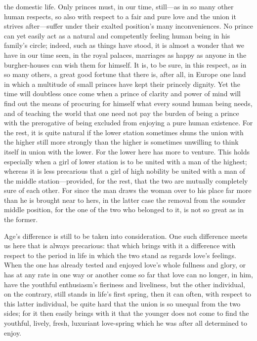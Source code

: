 \documentclass[12pt,a4paper]{book}
\begin{document}
the domestic life. Only princes must, in our time, still---as in so many
other human respects, so also with respect to a fair and pure love and the
union it strives after---suffer under their exalted position's many
inconveniences. No prince can yet easily act as a natural and competently
feeling human being in his family's circle; indeed, such as things have
stood, it is almost a wonder that we have in our time seen, in the royal
palaces, marriages as happy as anyone in the burgher-houses can wish them
for himself. It is, to be sure, in this respect, as in so many others, a
great good fortune that there is, after all, in Europe one land in which a
multitude of small princes have kept their princely dignity. Yet the time
will doubtless once come when a prince of clarity and power of mind will
find out the means of procuring for himself what every sound human being
needs, and of teaching the world that one need not pay the burden of being
a prince with the prerogative of being excluded from enjoying a pure human
existence. For the rest, it is quite natural if the lower station sometimes
shuns the union with the higher still more strongly than the higher is
sometimes unwilling to think itself in union with the lower. For the lower
here has more to venture. This holds especially when a girl of lower
station is to be united with a man of the highest; whereas it is less
precarious that a girl of high nobility be united with a man of the middle
station---provided, for the rest, that the two are mutually completely sure
of each other. For since the man draws the woman over to his place far more
than he is brought near to hers, in the latter case the removal from the
sounder middle position, for the one of the two who belonged to it, is not
so great as in the former.

Age's difference is still to be taken into consideration. One such
difference meets us here that is always precarious: that which brings with
it a difference with respect to the period in life in which the two stand
as regards love's feelings. When the one has already tested and enjoyed
love's whole fullness and glory, or has at any rate in one way or another
come so far that love can no longer, in him, have the youthful
enthusiasm's fieriness and liveliness, but the other individual, on the
contrary, still stands in life's first spring, then it can often, with
respect to this latter individual, be quite hard that the union is so
unequal from the two sides; for it then easily brings with it that the
younger does not come to find the youthful, lively, fresh, luxuriant
love-spring which he was after all determined to enjoy.
\end{document}
